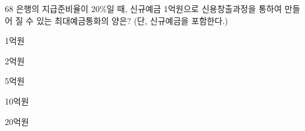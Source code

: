 \begin{question}{68}
은행의 지급준비율이 20\%일 때, 신규예금 1억원으로 신용창출과정을 통하여 만들어 질 수 있는 최대예금통화의 양은? (단, 신규예금을 포함한다.)
\begin{choices}
  \item 1억원
  \item 2억원
  \item 5억원
  \item 10억원
  \item 20억원
\end{choices}
\end{question}
